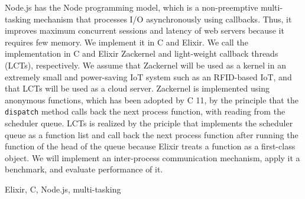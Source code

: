 \documentclass[submit,techrep]{ipsj}
\newcommand{\Rplus}{\protect\hspace{-.1em}\protect\raisebox{.8ex}{\smaller{\smaller\smaller\textbf{+}}}}
\newcommand{\Cpp}{\mbox{C\Rplus\Rplus}\xspace}
\begin{document}
\begin{eabstract}
Node.js has the Node programming model, which is a non-preemptive multi-tasking mechanism that processes I/O asynchronously using callbacks. Thus, it improves maximum concurrent sessions and latency of web servers because it requires few memory. We implement it in \Cpp and Elixir. We call the implementation in \Cpp and Elixir Zackernel and light-weight callback threads (LCTs), respectively. We assume that Zackernel will be used as a kernel in an extremely small and power-saving IoT system such as an RFID-based IoT, and that LCTs will be used as a cloud server. Zackernel is implemented using anonymous functions, which has been adopted by \Cpp 11, by the principle that the {\tt dispatch} method calls back the next process function, with reading from the scheduler queue. LCTs is realized by the priciple that implements the scheduler queue as a function list and call back the next process function after running the function of the head of the queue because Elixir treats a function as a first-class object. We will implement an inter-process communication mechanism, apply it a benchmark, and evaluate performance of it.
\end{eabstract}

\begin{ekeyword}
Elixir,  \Cpp , Node.js, multi-tasking
\end{ekeyword}

\maketitle



\begin{acknowledgment}

\end{acknowledgment}




\end{document}
